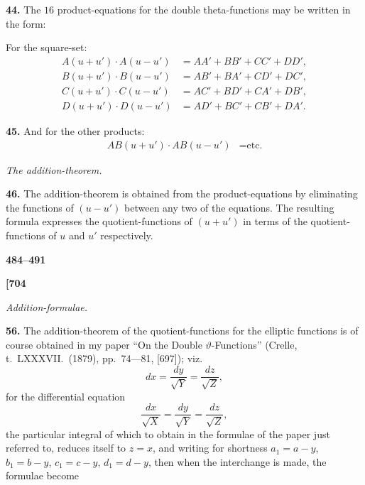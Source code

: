 \documentclass[11pt,a4paper]{book}
\begin{document}
\vspace{0.5em}

\noindent\textbf{44.}\quad
The $16$ product-equations for the double theta-functions may be written in the form:

For the square-set:
\begin{align*}
A(u + u') \cdot A(u - u') &= AA' + BB' + CC' + DD', \\
B(u + u') \cdot B(u - u') &= AB' + BA' + CD' + DC', \\
C(u + u') \cdot C(u - u') &= AC' + BD' + CA' + DB', \\
D(u + u') \cdot D(u - u') &= AD' + BC' + CB' + DA'.
\end{align*}

\noindent\textbf{45.}\quad
And for the other products:
\begin{align*}
AB(u + u') \cdot AB(u - u') &= \text{etc.}
\end{align*}

\vspace{1em}

\begin{center}
\textit{The addition-theorem.}
\end{center}

\vspace{0.5em}

\noindent\textbf{46.}\quad
The addition-theorem is obtained from the product-equations by eliminating the functions of $(u - u')$ between any two of the equations. The resulting formula expresses the quotient-functions of $(u + u')$ in terms of the quotient-functions of $u$ and $u'$ respectively.

\vspace{1em}

\begin{center}
\textbf{484--491}
\end{center}

\vspace{0.5em}

\noindent\textbf{[704}

\vspace{0.5em}

\begin{center}
\textit{Addition-formulae.}
\end{center}

\vspace{0.5em}

\noindent\textbf{56.}\quad
The addition-theorem of the quotient-functions for the elliptic functions is of course obtained in my paper ``On the Double $\vartheta$-Functions'' (Crelle, t.~LXXXVII.\ (1879), pp.~74---81, [697]); viz.
\[
dx = \frac{dy}{\sqrt{Y}} = \frac{dz}{\sqrt{Z}},
\]
for the differential equation
\[
\frac{dx}{\sqrt{X}} = \frac{dy}{\sqrt{Y}} = \frac{dz}{\sqrt{Z}},
\]
the particular integral of which to obtain in the formulae of the paper just referred to, reduces itself to $z = x$, and writing for shortness $a_1 = a - y$, $b_1 = b - y$, $c_1 = c - y$, $d_1 = d - y$, then when the interchange is made, the formulae become
\end{document}
